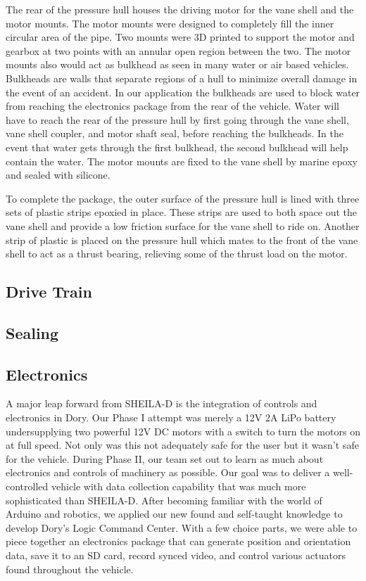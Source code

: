 \documentclass{report}
\begin{document}
The rear of the pressure hull houses the driving motor for the vane shell and the motor mounts.  The motor mounts were designed to completely fill the inner circular area of the pipe.  Two mounts were 3D printed to support the motor and gearbox at two points with an annular open region between the two.  The motor mounts also would act as bulkhead as seen in many water or air based vehicles.  Bulkheads are walls that separate regions of a hull to minimize overall damage in the event of an accident.  In our application the bulkheads are used to block water from reaching the electronics package from the rear of the vehicle.  Water will have to reach the rear of the pressure hull by first going through the vane shell, vane shell coupler, and motor shaft seal, before reaching the bulkheads.  In the event that water gets through the first bulkhead, the second bulkhead will help contain the water.  The motor mounts are fixed to the vane shell by marine epoxy and sealed with silicone. \par 
To complete the package, the outer surface of the pressure hull is lined with three sets of plastic strips epoxied in place.  These strips are used to both space out the vane shell and provide a low friction surface for the vane shell to ride on.  Another strip of plastic is placed on the pressure hull which mates to the front of the vane shell to act as a thrust bearing, relieving some of the thrust load on the motor.  
\subsection{Drive Train}
\subsection{Sealing}
\subsection{Electronics}
A major leap forward from SHEILA-D is the integration of controls and electronics in Dory.  Our Phase I attempt was merely a 12V 2A LiPo battery undersupplying two powerful 12V DC motors with a switch to turn the motors on at full speed.  Not only was this not adequately safe for the user but it wasn’t safe for the vehicle.  During Phase II, our team set out to learn as much about electronics and controls of machinery as possible.  Our goal was to deliver a well-controlled vehicle with data collection capability that was much more sophisticated than SHEILA-D.    After becoming familiar with the world of Arduino and robotics, we applied our new found and self-taught knowledge to develop Dory’s Logic Command Center.  With a few choice parts, we were able to piece together an electronics package that can generate position and orientation data, save it to an SD card, record synced video, and control various actuators found throughout the vehicle.  
\end{document}

